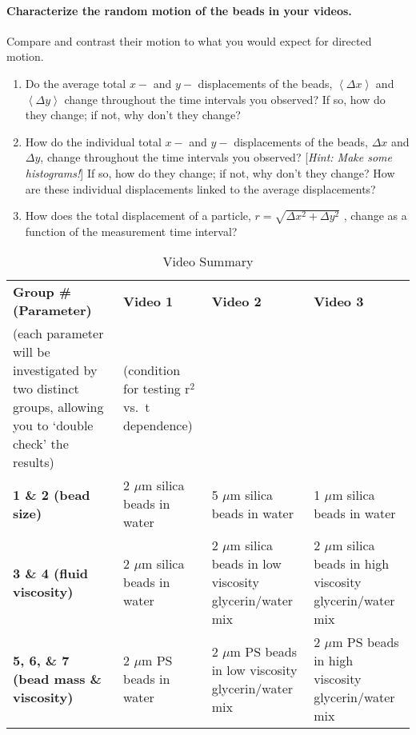 \paragraph*{Characterize the random motion of the beads in your videos.} Compare and contrast their motion to what you would expect for directed motion.
\begin{enumerate}
\item Do the average total $x-$ and $y-$ displacements of the beads, $\left \langle \Delta x \right \rangle$ and $\left \langle \Delta y \right \rangle$ change throughout the time intervals you observed? If so, how do they change; if not, why don't they change?
\item How do the individual total $x-$ and $y-$ displacements of the beads, $\Delta x$ and $\Delta y$, change throughout the time intervals you observed? [\textit{Hint: Make some histograms!}] If so, how do they change; if not, why don't they change? How are these individual displacements linked to the average displacements?
\item How does the total displacement of a particle, $r=\sqrt{\Delta x^2+\Delta y^2}$ , change as a function of the measurement time interval?
\end{enumerate}

\begin{table}[ht]
\centering
\begin{tabular}{|p{4.5cm}|p{3cm}|p{3cm}|p{3cm}|}
\hline
 \textbf{Group \# (Parameter)} & \textbf{Video 1} & \textbf{Video 2} & \textbf{Video 3}  \\
 (each parameter will be investigated by two distinct groups, allowing you to `double check' the results) & (condition for testing r$^2$ vs.\ t dependence) &  & \\ \hline
 \textbf{1 \& 2 (bead size)} & 2 $\mu$m silica beads in water & 5 $\mu$m silica beads in water & 1 $\mu$m silica beads in water \\ \hline
 \textbf{3 \& 4 (fluid viscosity)} & 2 $\mu$m silica beads in water & 2 $\mu$m silica beads in low viscosity glycerin/water mix & 2 $\mu$m silica beads in high viscosity glycerin/water mix \\ \hline
 \textbf{5, 6, \& 7 (bead mass \& viscosity)} & 2 $\mu$m PS beads in water & 2 $\mu$m PS beads in low viscosity glycerin/water mix & 2 $\mu$m PS beads in high viscosity glycerin/water mix \\ \hline
\end{tabular}
\caption{Video Summary}
\label{tab:exp3video}
\end{table}

